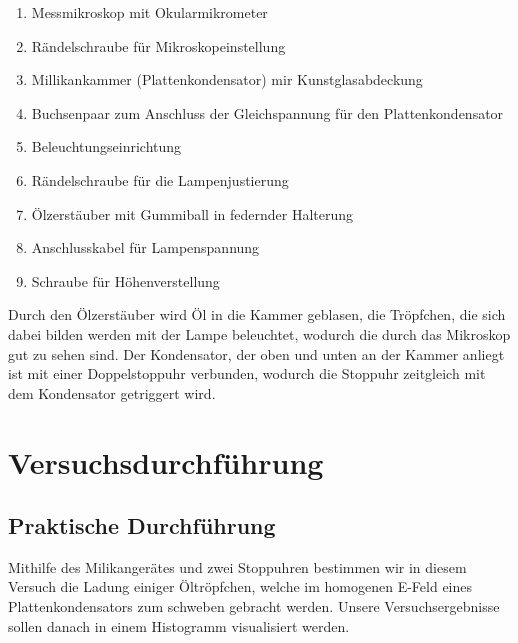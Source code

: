 \documentclass[12pt]{scrartcl}
\begin{document}
\begin{enumerate}
\item	Messmikroskop mit Okularmikrometer

\item	Rändelschraube für Mikroskopeinstellung

\item	Millikankammer (Plattenkondensator) mir Kunstglasabdeckung

\item	Buchsenpaar zum Anschluss der Gleichspannung für den Plattenkondensator

\item	Beleuchtungseinrichtung

\item	Rändelschraube für die Lampenjustierung

\item	Ölzerstäuber mit Gummiball in federnder Halterung

\item	Anschlusskabel für Lampenspannung

\item	Schraube für Höhenverstellung
\end{enumerate}

Durch den Ölzerstäuber wird Öl in die Kammer geblasen, die Tröpfchen, die sich dabei bilden werden mit der Lampe beleuchtet, wodurch die durch das Mikroskop gut zu sehen sind. Der Kondensator, der oben und unten an der Kammer anliegt ist mit einer Doppelstoppuhr verbunden, wodurch die Stoppuhr zeitgleich mit dem Kondensator getriggert wird.

\section{Versuchsdurchführung}


\subsection{Praktische Durchführung}
Mithilfe des Milikangerätes und zwei Stoppuhren bestimmen wir in diesem Versuch die Ladung einiger Öltröpfchen, welche im homogenen E-Feld eines Plattenkondensators zum schweben gebracht werden. Unsere Versuchsergebnisse sollen danach in einem Histogramm visualisiert werden.
\end{document}
